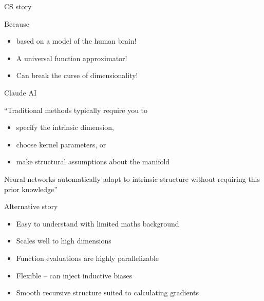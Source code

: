 \begin{frame}{CS story}

    Because 

    \begin{itemize}
        \item based on a model of the human brain! 
        \vspace{0.5em}
        \item A universal function approximator!
        \vspace{0.5em}
        \item Can break the curse of dimensionality!
    \end{itemize}

    \medskip
    \medskip
    \medskip
    \pause

    \begin{center}
    \end{center}

\end{frame}


\begin{frame}{Claude AI}
    
    ``Traditional methods typically require you to 
    \begin{itemize}
        \item specify the intrinsic dimension, 
    \medskip
        \item choose kernel parameters, or 
    \medskip
        \item make structural assumptions about the manifold 
    \end{itemize}

    \medskip
    Neural networks automatically adapt to 
    intrinsic structure without requiring this prior knowledge''

    \medskip
    \medskip
    \medskip
    \pause

    \begin{center}
    \end{center}

\end{frame}

\begin{frame}{Alternative story}


    \begin{itemize}
        \item Easy to understand with limited maths background
        \vspace{0.5em}
        \item Scales well to high dimensions 
        \vspace{0.5em}
        \item Function evaluations are highly parallelizable
        \vspace{0.5em}
        \item Flexible -- can inject inductive biases
        \vspace{0.5em}
        \item Smooth recursive structure suited to calculating gradients
    \end{itemize}

\end{frame}

